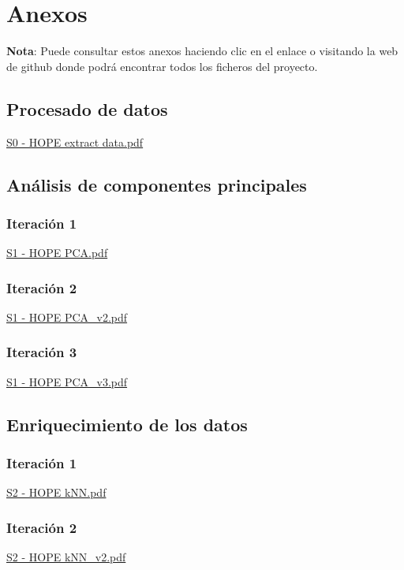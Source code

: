 \chapter{Anexos}
\label{chapter:anexos}

\textbf{Nota}: Puede consultar estos anexos haciendo clic en el enlace o visitando la web de github\cite{ref:gitlab} donde podrá encontrar todos los ficheros del proyecto.

\section{Procesado de datos}
\label{anx01:procesado_datos}
\href{file://./anexos/S0 - HOPE extract data.pdf}{S0 - HOPE extract data.pdf}

\section{Análisis de componentes principales}
\label{anx02:pca}
\subsection{Iteración 1}
\label{anx02:pca1}
\href{file://./anexos/S1 - HOPE PCA.pdf}{S1 - HOPE PCA.pdf}

\subsection{Iteración 2}
\label{anx02:pca2}
\href{file://./anexos/S1 - HOPE PCA_v2.pdf}{S1 - HOPE PCA\_v2.pdf}

\subsection{Iteración 3}
\label{anx02:pca3}
\href{file://./anexos/S1 - HOPE PCA_v3.pdf}{S1 - HOPE PCA\_v3.pdf}

\section{Enriquecimiento de los datos}
\label{anx03:knn}
\subsection{Iteración 1}
\label{anx03:knn1}
\href{file://./anexos/S2 - HOPE kNN.pdf}{S2 - HOPE kNN.pdf}

\subsection{Iteración 2}
\label{anx03:knn2}
\href{file://./anexos/S2 - HOPE kNN_v2.pdf}{S2 - HOPE kNN\_v2.pdf}

